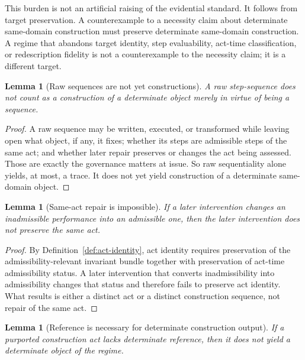 \documentclass[11pt]{article}
\newtheorem{lemma}[theorem]{Lemma}
\theoremstyle{definition}
\theoremstyle{remark}
\begin{document}
\noindent This burden is not an artificial raising of the evidential standard. It follows from target preservation. A counterexample to a necessity claim about determinate same-domain construction must preserve determinate same-domain construction. A regime that abandons target identity, step evaluability, act-time classification, or redescription fidelity is not a counterexample to the necessity claim; it is a different target.

\begin{lemma}[Raw sequences are not yet constructions]\label{lem:raw-not-construction}
A raw step-sequence does not count as a construction of a determinate object merely in virtue of being a sequence.
\end{lemma}

\begin{proof}
A raw sequence may be written, executed, or transformed while leaving open what object, if any, it fixes; whether its steps are admissible steps of the same act; and whether later repair preserves or changes the act being assessed. Those are exactly the governance matters at issue. So raw sequentiality alone yields, at most, a trace. It does not yet yield construction of a determinate same-domain object.
\end{proof}

\begin{lemma}[Same-act repair is impossible]\label{lem:same-act-repair-impossible}
If a later intervention changes an inadmissible performance into an admissible one, then the later intervention does not preserve the same act.
\end{lemma}

\begin{proof}
By Definition~\ref{def:act-identity}, act identity requires preservation of the admissibility-relevant invariant bundle together with preservation of act-time admissibility status. A later intervention that converts inadmissibility into admissibility changes that status and therefore fails to preserve act identity. What results is either a distinct act or a distinct construction sequence, not repair of the same act.
\end{proof}

\begin{lemma}[Reference is necessary for determinate construction output]\label{lem:reference-necessity}
If a purported construction act lacks determinate reference, then it does not yield a determinate object of the regime.
\end{lemma}
\end{document}
